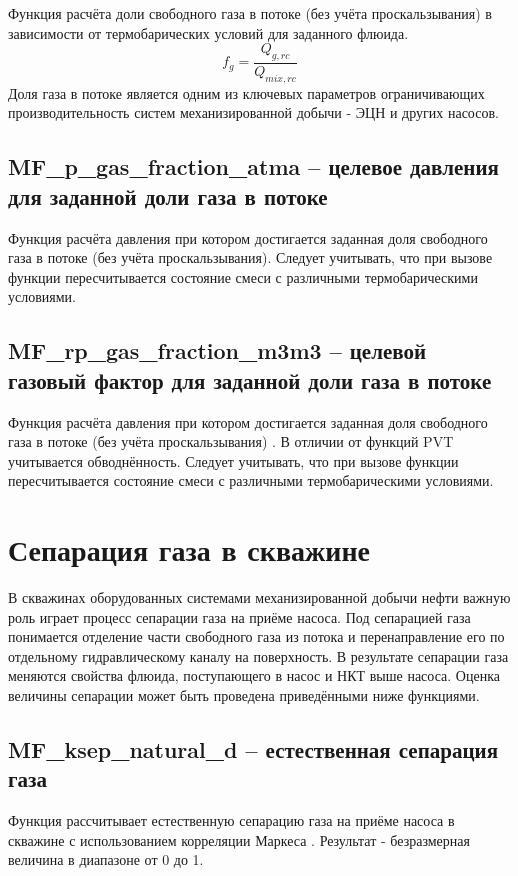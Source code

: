 Функция расчёта доли свободного газа в потоке (без учёта проскальзывания) в зависимости от термобарических условий для заданного флюида. 
$$f_g = \frac{Q_{g,rc}}{Q_{mix,rc}} $$
Доля газа в потоке является одним из ключевых параметров ограничивающих производительность систем механизированной добычи - ЭЦН и других насосов.


\subsection{MF\_p\_gas\_fraction\_atma – целевое давления для заданной доли газа в потоке}
Функция расчёта давления при котором достигается заданная доля свободного газа в потоке (без учёта проскальзывания). 
Следует учитывать, что при вызове функции пересчитывается состояние смеси с различными термобарическими условиями.

\subsection{MF\_rp\_gas\_fraction\_m3m3 – целевой газовый фактор для заданной доли газа в потоке}
Функция расчёта давления при котором достигается заданная доля свободного газа в потоке (без учёта проскальзывания) . 
В отличии от функций PVT учитывается обводнённость.
Следует учитывать, что при вызове функции пересчитывается состояние смеси с различными термобарическими условиями.

\section{Сепарация газа в скважине}
В скважинах оборудованных системами механизированной добычи нефти важную роль играет процесс сепарации газа на приёме насоса. Под сепарацией газа понимается отделение части свободного газа из потока и перенаправление его по отдельному гидравлическому каналу на поверхность. В результате сепарации газа меняются свойства флюида, поступающего в насос и НКТ выше насоса. Оценка величины сепарации может быть проведена приведёнными ниже функциями.

\subsection{MF\_ksep\_natural\_d – естественная сепарация газа}
Функция рассчитывает естественную сепарацию газа на приёме насоса в скважине с использованием корреляции Маркеса \cite{Marquez_2003} . Результат - безразмерная величина в диапазоне от 0 до 1. 


